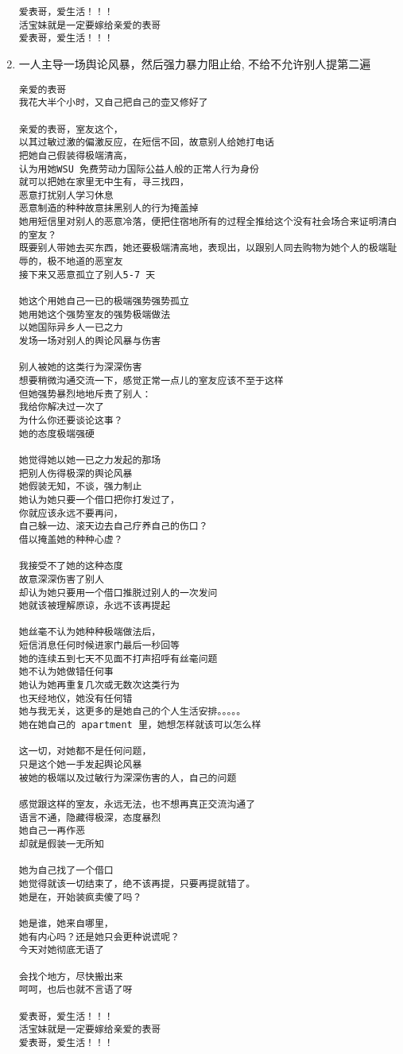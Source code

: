 \documentclass[9pt, b5paper]{article}
\begin{document}
\begin{enumerate}
\begin{verbatim}
爱表哥，爱生活！！！
活宝妹就是一定要嫁给亲爱的表哥
爱表哥，爱生活！！！
\end{verbatim}
\item 一人主导一场舆论风暴，然后强力暴力阻止给, 不给不允许别人提第二遍
\label{sec-3-2-3-3}
\begin{verbatim}
亲爱的表哥
我花大半个小时，又自己把自己的壶又修好了

亲爱的表哥，室友这个，
以其过敏过激的偏激反应，在短信不回，故意别人给她打电话
把她自己假装得极端清高，
认为用她WSU 免费劳动力国际公益人般的正常人行为身份
就可以把她在家里无中生有，寻三找四，
恶意打扰别人学习休息
恶意制造的种种故意抹黑别人的行为掩盖掉
她用短信里对别人的恶意冷落，便把住宿地所有的过程全推给这个没有社会场合来证明清白的室友？
既要别人带她去买东西，她还要极端清高地，表现出，以跟别人同去购物为她个人的极端耻辱的，极不地道的恶室友
接下来又恶意孤立了别人5-7 天

她这个用她自己一已的极端强势强势孤立
她用她这个强势室友的强势极端做法
以她国际异乡人一已之力
发场一场对别人的舆论风暴与伤害

别人被她的这类行为深深伤害
想要稍微沟通交流一下，感觉正常一点儿的室友应该不至于这样
但她强势暴烈地地斥责了别人：
我给你解决过一次了
为什么你还要谈论这事？
她的态度极端强硬

她觉得她以她一已之力发起的那场
把别人伤得极深的舆论风暴
她假装无知，不谈，强力制止
她认为她只要一个借口把你打发过了，
你就应该永远不要再问，
自己躲一边、滚天边去自己疗养自己的伤口？
借以掩盖她的种种心虚？

我接受不了她的这种态度
故意深深伤害了别人
却认为她只要用一个借口推脱过别人的一次发问
她就该被理解原谅，永远不该再提起

她丝毫不认为她种种极端做法后，
短信消息任何时候进家门最后一秒回等
她的连续五到七天不见面不打声招呼有丝毫问题
她不认为她做错任何事
她认为她再重复几次或无数次这类行为
也天经地仪，她没有任何错
她与我无关，这更多的是她自己的个人生活安排。。。。。
她在她自己的 apartment 里，她想怎样就该可以怎么样

这一切，对她都不是任何问题，
只是这个她一手发起舆论风暴
被她的极端以及过敏行为深深伤害的人，自己的问题

感觉跟这样的室友，永远无法，也不想再真正交流沟通了
语言不通，隐藏得极深，态度暴烈
她自己一再作恶
却就是假装一无所知

她为自己找了一个借口
她觉得就该一切结束了，绝不该再提，只要再提就错了。
她是在，开始装疯卖傻了吗？

她是谁，她来自哪里，
她有内心吗？还是她只会更种说谎呢？
今天对她彻底无语了

会找个地方，尽快搬出来
呵呵，也后也就不言语了呀

爱表哥，爱生活！！！
活宝妹就是一定要嫁给亲爱的表哥
爱表哥，爱生活！！！
\end{verbatim}
\end{enumerate}
\end{document}
